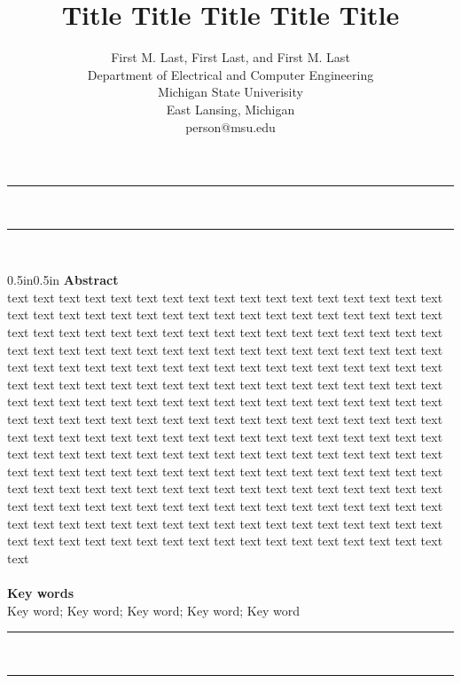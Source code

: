 \documentclass[letterpaper,10pt]{article}
\title{\vspace{-2cm}\textbf{Title Title Title Title Title}}
\author{First M. Last, First Last, and First M. Last \\
Department of Electrical and Computer Engineering \\
Michigan State Univerisity\\
East Lansing, Michigan\\
person@msu.edu}
\date{} %
\begin{document}
\maketitle

\noindent\rule{\textwidth}{2pt}\\[\dimexpr-\baselineskip+2pt]
\rule{\textwidth}{0.4pt}\\
\begin{changemargin}{0.5in}{0.5in}
\large \textbf{Abstract} \\
\normalsize
text text text text text text text text text text text text text text text text text text text text text text text text text text text text text text text text text text text text text text text text text text text text text text text text text text text text text text text text text text text text text text text text text text text text text text text text text text text text text text text text text text text text text text text text text text text text text text text text text text text text text text text text text text text text text text text text text text text text text text text text text text text text text text text text text text text text text text text text text text text text text text text text text text text text text text text text text text text text text text text text text text text text text text text text text text text text text text text text text text text text text text text text text text text text text text text text text text text text text text text text text text text text text text text text text text text text text text text text text text text text text text text text text text text text text text text text text text text text text text text text text text text text text text text text text text text text text text text text \\ 
\\
\large \textbf{Key words} \\
\normalsize Key word; Key word; Key word; Key word; Key word \\
\end{changemargin}
\rule{\textwidth}{2pt}\\[\dimexpr-\baselineskip+2pt]
\rule{\textwidth}{0.4pt}
\end{document}
